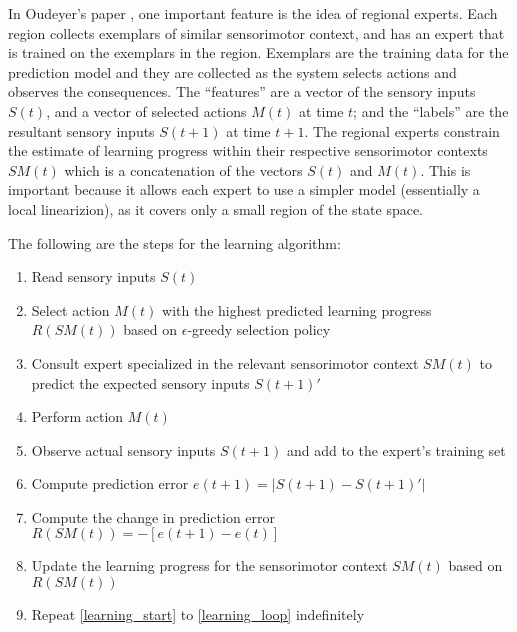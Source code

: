 In Oudeyer's paper \cite{Oudeyer2007}, one important feature is the idea of regional experts. Each region collects exemplars of similar sensorimotor context, and has an expert that is trained on the exemplars in the region. Exemplars are the training data for the prediction model and they are collected as the system selects actions and observes the consequences. The ``features'' are a vector of the sensory inputs $S(t)$, and a vector of selected actions $M(t)$ at time $t$; and the ``labels'' are the resultant sensory inputs $S(t+1)$ at time $t+1$. The regional experts constrain the estimate of learning progress within their respective sensorimotor contexts $SM(t)$ which is a concatenation of the vectors $S(t)$ and $M(t)$. This is important because it allows each expert to use a simpler model (essentially a local linearizion), as it covers only a small region of the state space.  

The following are the steps for the learning algorithm:

\begin{enumerate}
	\item \label{learning_start} Read sensory inputs $S(t)$
	\item Select action $M(t)$ with the highest predicted learning progress $R(SM(t))$ based on $\epsilon$-greedy selection policy
	\item Consult expert specialized in the relevant sensorimotor context $SM(t)$ to predict the expected sensory inputs $S(t+1)'$
	\item Perform action $M(t)$
	\item Observe actual sensory inputs $S(t+1)$ and add to the expert's training set
	\item Compute prediction error $e(t+1) = |S(t+1) - S(t+1)'|$
	\item Compute the change in prediction error $R(SM(t)) = -[e(t+1) - e(t)]$
	\item Update the learning progress for the sensorimotor context $SM(t)$ based on $R(SM(t))$
	\item \label{learning_loop} Repeat \ref{learning_start} to \ref{learning_loop} indefinitely
\end{enumerate}

